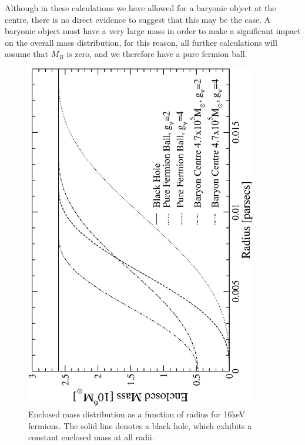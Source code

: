 Although in these calculations we have allowed for a baryonic object at the centre, there is no direct evidence to suggest that this
may be the case. A baryonic object must have a
very large mass in order to make a significant impact on the overall mass distribution, for this reason, all further calculations will
assume that $M_B$ is zero, and we therefore have a pure fermion ball.
\begin{figure}[p]
	\begin{center}
	\includegraphics[angle=-90,width=0.9\textwidth]{eps/classicalmassdist.eps}
	\caption{Enclosed mass distribution as a function of radius for 16keV fermions. The solid line denotes a black hole,
	which exhibits a constant enclosed mass at all radii.}
	\label{fig_classicalmassdist}
	\end{center}
\end{figure}
